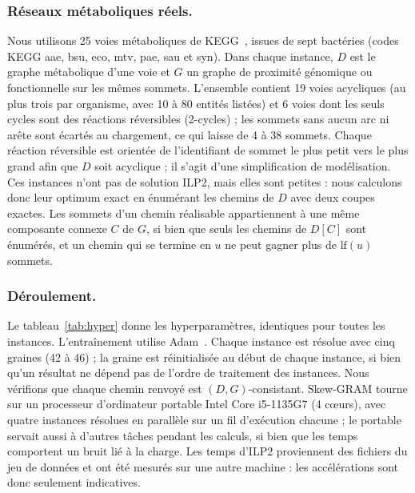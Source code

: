 \documentclass{llncs}
\begin{document}
\subsubsection{Réseaux métaboliques réels.}
Nous utilisons 25 voies métaboliques de KEGG~\cite{kanehisa2000}, issues de sept bactéries (codes KEGG aae, bsu, eco, mtv, pae, sau et syn). Dans chaque instance, $D$ est le graphe métabolique d'une voie et $G$ un graphe de proximité génomique ou fonctionnelle sur les mêmes sommets. L'ensemble contient 19 voies acycliques (au plus trois par organisme, avec 10 à 80 entités listées) et 6 voies dont les seuls cycles sont des réactions réversibles (2-cycles) ; les sommets sans aucun arc ni arête sont écartés au chargement, ce qui laisse de 4 à 38 sommets. Chaque réaction réversible est orientée de l'identifiant de sommet le plus petit vers le plus grand afin que $D$ soit acyclique ; il s'agit d'une simplification de modélisation. Ces instances n'ont pas de solution ILP2, mais elles sont petites : nous calculons donc leur optimum exact en énumérant les chemins de $D$ avec deux coupes exactes. Les sommets d'un chemin réalisable appartiennent à une même composante connexe $C$ de $G$, si bien que seuls les chemins de $D[C]$ sont énumérés, et un chemin qui se termine en $u$ ne peut gagner plus de $\mathrm{lf}(u)$ sommets.

\subsubsection{Déroulement.}
Le tableau~\ref{tab:hyper} donne les hyperparamètres, identiques pour toutes les instances. L'entraînement utilise Adam~\cite{kingma2014}. Chaque instance est résolue avec cinq graines (42 à 46) ; la graine est réinitialisée au début de chaque instance, si bien qu'un résultat ne dépend pas de l'ordre de traitement des instances. Nous vérifions que chaque chemin renvoyé est $(D,G)$-consistant. Skew-GRAM tourne sur un processeur d'ordinateur portable Intel Core i5-1135G7 (4 c\oe{}urs), avec quatre instances résolues en parallèle sur un fil d'exécution chacune ; le portable servait aussi à d'autres tâches pendant les calculs, si bien que les temps comportent un bruit lié à la charge. Les temps d'ILP2 proviennent des fichiers du jeu de données et ont été mesurés sur une autre machine : les accélérations sont donc seulement indicatives.
\end{document}
